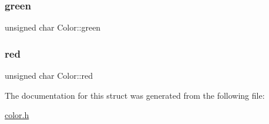 \mbox{\label{structColor_a070831365fe6c626bc0020915a917081}} 
\subsubsection{\texorpdfstring{green}{green}}
{\footnotesize\ttfamily unsigned char Color\+::green}

\mbox{\label{structColor_a245f5a423cdaaaeff27047036c24b7ef}} 
\subsubsection{\texorpdfstring{red}{red}}
{\footnotesize\ttfamily unsigned char Color\+::red}



The documentation for this struct was generated from the following file\+:\begin{DoxyCompactItemize}
\item 
\hyperlink{color_8h}{color.\+h}\end{DoxyCompactItemize}
